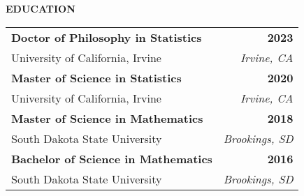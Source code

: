 %
\curriculumvitae
{

\textbf{EDUCATION}
  
  \begin{tabular*}{1\textwidth}{@{\extracolsep{\fill}}lr}
    \textbf{Doctor of Philosophy in Statistics} & \textbf{2023} \\
    \vspace{6pt}
    University of California, Irvine & \emph{Irvine, CA} \\
    \textbf{Master of Science in Statistics} & \textbf{2020} \\
    \vspace{6pt}
    University of California, Irvine & \emph{Irvine, CA} \\
    \textbf{Master of Science in Mathematics} & \textbf{2018} \\
    \vspace{6pt}
    South Dakota State University & \emph{Brookings, SD} \\
    \textbf{Bachelor of Science in Mathematics} & \textbf{2016} \\
    \vspace{6pt}
    South Dakota State University & \emph{Brookings, SD} \\
  \end{tabular*}





}
